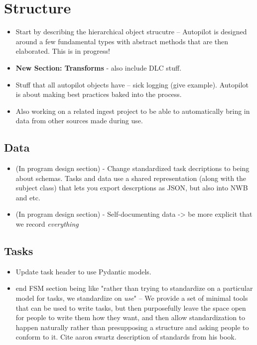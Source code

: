 \section{Structure}

\begin{itemize}
\item Start by describing the hierarchical object strucutre -- Autopilot is designed around a few fundamental types with abstract methods that are then elaborated. This is in progress!
\item \textbf{New Section: Transforms} - also include DLC stuff.
\item Stuff that all autopilot objects have -- sick logging (give example). Autopilot is about making best practices baked into the process. 
\item Also working on a related ingest project to be able to automatically bring in data from other sources made during use. 
\end{itemize}

\subsection{Data}

\begin{itemize}
\item (In program design section) - Change standardized task decriptions to being about schemas. Tasks and data use a shared representation (along with the subject class) that lets you export descrptions as JSON, but also into NWB and etc.
\item (In program design section) - Self-documenting data -> be more explicit that we record \textit{everything}
\end{itemize}

\subsection{Tasks}

\begin{itemize}
\item Update task header to use Pydantic models.
\item end FSM section being like "rather than trying to standardize on a particular model for tasks, we standardize on \textit{use}" -- We provide a set of minimal tools that can be used to write tasks, but then purposefully leave the space open for people to write them how they want, and then allow standardization to happen naturally rather than presupposing a structure and asking people to conform to it. Cite aaron swartz description of standards from his book.
\end{itemize}


